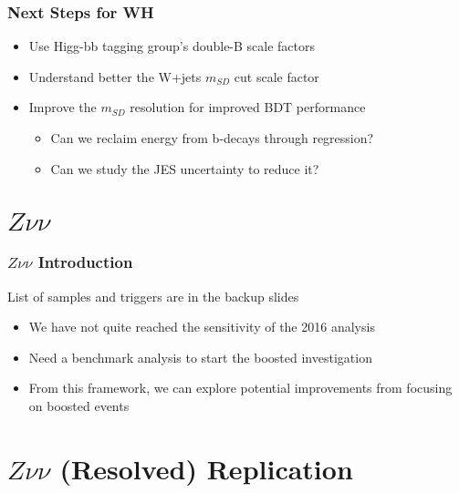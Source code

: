 \documentclass{beamer}
\begin{document}
\begin{frame}
  \frametitle{Next Steps for WH}
  \begin{itemize}
  \item Use Higg-bb tagging group's double-B scale factors
  \item Understand better the W+jets $m_{SD}$ cut scale factor
  \item Improve the $m_{SD}$ resolution for improved BDT performance
    \begin{itemize}
    \item Can we reclaim energy from b-decays through regression?
    \item Can we study the JES uncertainty to reduce it?
    \end{itemize}
  \end{itemize}
\end{frame}

\section{$Z\nu\nu$}

\begin{frame}
  \frametitle{$Z\nu\nu$ Introduction}
  List of samples and triggers are in the backup slides

  \begin{itemize}
  \item We have not quite reached the sensitivity of the 2016 analysis
  \item Need a benchmark analysis to start the boosted investigation
  \item From this framework, we can explore potential improvements
    from focusing on boosted events
  \end{itemize}

\end{frame}

\section{$Z\nu\nu$ (Resolved) Replication}
\end{document}
